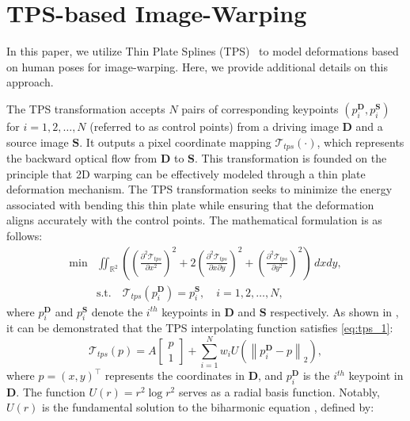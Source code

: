\section{TPS-based Image-Warping}
\label{sec:sub-tps}

In this paper, we utilize Thin Plate Splines (TPS)~\cite{zhao2022thin} to model deformations based on human poses for image-warping. Here, we provide additional details on this approach.

The TPS transformation accepts \(N\) pairs of corresponding keypoints \((p^\mathbf{D}_i, p^\mathbf{S}_i)\) for \(i=1,2,\ldots, N\) (referred to as control points) from a driving image \(\mathbf{D}\) and a source image \(\mathbf{S}\). It outputs a pixel coordinate mapping \(\mathcal{T}_{tps}\left(\cdot\right)\), which represents the backward optical flow from \(\mathbf{D}\) to \(\mathbf{S}\). This transformation is founded on the principle that 2D warping can be effectively modeled through a thin plate deformation mechanism. The TPS transformation seeks to minimize the energy associated with bending this thin plate while ensuring that the deformation aligns accurately with the control points. The mathematical formulation is as follows:
\begin{equation}
\begin{split}
\min &\iint_{\mathbb{R}^{2}} \left( \left( \frac{\partial^{2} \mathcal{T}_{tps}}{\partial x^{2}} \right)^{2} + 2 \left( \frac{\partial^{2} \mathcal{T}_{tps}}{\partial x \partial y} \right)^{2} + \left( \frac{\partial^{2} \mathcal{T}_{tps}}{\partial y^{2}} \right)^{2} \right) \, dx dy, \label{eq:tps_1} \\
&\text{s.t.} \quad \mathcal{T}_{tps}(p_{i}^{\mathbf{D}}) = p_{i}^{\mathbf{S}}, \quad i = 1,2, \ldots, N,
\end{split}
\end{equation}
where \(p_{i}^{\mathbf{D}}\) and \(p_{i}^{\mathbf{S}}\) denote the \(i^{th}\) keypoints in \(\mathbf{D}\) and \(\mathbf{S}\) respectively. As shown in \cite{zhao2022thin}, it can be demonstrated that the TPS interpolating function satisfies \cref{eq:tps_1}:
\begin{equation}
\mathcal{T}_{tps}(p)=A\left[\begin{array}{l}
p \\
1
\end{array}\right]+\sum_{i=1}^{N} w_{i} U\left(\left\|p^{\mathbf{D}}_{i}-p\right\|_{2}\right), \label{eq:tps_2}
\end{equation}
where \(p=(x, y)^{\top}\) represents the coordinates in \(\mathbf{D}\), and \(p^{\mathbf{D}}_{i}\) is the \(i^{th}\) keypoint in \(\mathbf{D}\). The function \(U(r)=r^{2} \log r^{2}\) serves as a radial basis function. Notably, \(U(r)\) is the fundamental solution to the biharmonic equation \cite{selvadurai2000biharmonic}, defined by:
